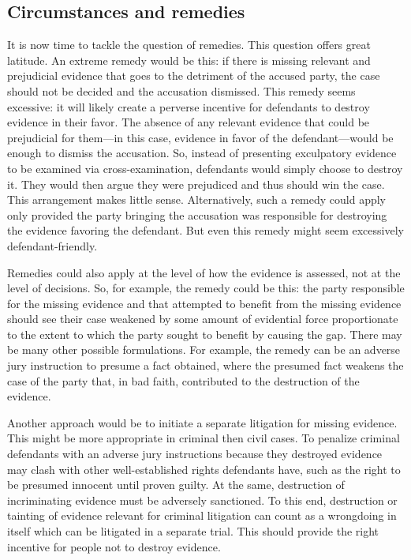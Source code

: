 \documentclass[
  10pt,
  dvipsnames,enabledeprecatedfontcommands]{scrartcl}
\begin{document}
\hypertarget{circumstances-and-remedies}{%
\subsection{Circumstances and
remedies}\label{circumstances-and-remedies}}

It is now time to tackle the question of remedies. This question offers
great latitude. An extreme remedy would be this: if there is missing
relevant and prejudicial evidence that goes to the detriment of the
accused party, the case should not be decided and the accusation
dismissed. This remedy seems excessive: it will likely create a perverse
incentive for defendants to destroy evidence in their favor. The absence
of any relevant evidence that could be prejudicial for them---in this
case, evidence in favor of the defendant---would be enough to dismiss
the accusation. So, instead of presenting exculpatory evidence to be
examined via cross-examination, defendants would simply choose to
destroy it. They would then argue they were prejudiced and thus should
win the case. This arrangement makes little sense. Alternatively, such a
remedy could apply only provided the party bringing the accusation was
responsible for destroying the evidence favoring the defendant. But even
this remedy might seem excessively defendant-friendly.

Remedies could also apply at the level of how the evidence is assessed,
not at the level of decisions. So, for example, the remedy could be
this: the party responsible for the missing evidence and that attempted
to benefit from the missing evidence should see their case weakened by
some amount of evidential force proportionate to the extent to which the
party sought to benefit by causing the gap. There may be many other
possible formulations. For example, the remedy can be an adverse jury
instruction to presume a fact obtained, where the presumed fact weakens
the case of the party that, in bad faith, contributed to the destruction
of the evidence.

Another approach would be to initiate a separate litigation for missing
evidence. This might be more appropriate in criminal then civil cases.
To penalize criminal defendants with an adverse jury instructions
because they destroyed evidence may clash with other well-established
rights defendants have, such as the right to be presumed innocent until
proven guilty. At the same, destruction of incriminating evidence must
be adversely sanctioned. To this end, destruction or tainting of
evidence relevant for criminal litigation can count as a wrongdoing in
itself which can be litigated in a separate trial. This should provide
the right incentive for people not to destroy evidence.
\end{document}
